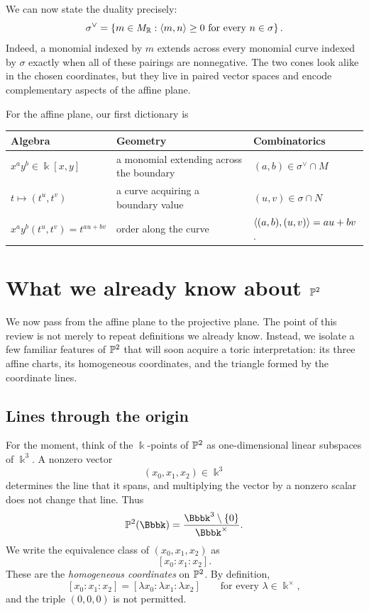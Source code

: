 We can now state the duality precisely:
\[
\sigma^\vee
=
\left\{
m\in M_{\mathbb{R}}:
\left\langle m,n\right\rangle\geq0
\text{ for every }n\in\sigma
\right\}.
\]
Indeed, a monomial indexed by \(m\) extends across every monomial curve
indexed by \(\sigma\) exactly when all of these pairings are
nonnegative. The two cones look alike in the chosen coordinates, but
they live in paired vector spaces and encode complementary aspects of
the affine plane.

\begin{threedictionaries}
For the affine plane, our first dictionary is
\begin{center}
\small
\begin{tabularx}{\linewidth}{
  >{\centering\arraybackslash}X|
  >{\centering\arraybackslash}X|
  >{\centering\arraybackslash}X}
\textbf{Algebra} & \textbf{Geometry} & \textbf{Combinatorics}\\
\hline
\(x^ay^b\in\Bbbk[x,y]\) &
a monomial extending across the boundary &
\((a,b)\in\sigma^\vee\cap M\)
\\[2mm]
\(t\mapsto(t^u,t^v)\) &
a curve acquiring a boundary value &
\((u,v)\in\sigma\cap N\)
\\[2mm]
\(x^ay^b(t^u,t^v)=t^{au+bv}\) &
order along the curve &
\(\left\langle (a,b),(u,v)\right\rangle=au+bv\).
\end{tabularx}
\end{center}
\end{threedictionaries}


\section{What we already know about
\texorpdfstring{\(\mathbb{P}^2\)}{P2}}
\label{sec:p2-review}

We now pass from the affine plane to the projective plane. The point of
this review is not merely to repeat definitions we already know.
Instead, we isolate a few familiar features of \(\mathbb{P}^2\) that will
soon acquire a toric interpretation: its three affine charts, its
homogeneous coordinates, and the triangle formed by the coordinate
lines.

\subsection{Lines through the origin}

For the moment, think of the \(\Bbbk\)-points of \(\mathbb{P}^2\) as
one-dimensional linear subspaces of \(\Bbbk^3\). A nonzero vector
\[
(x_0,x_1,x_2)\in\Bbbk^3
\]
determines the line that it spans, and multiplying the vector by a
nonzero scalar does not change that line. Thus
\[
\PP^2(\Bbbk)
=
\frac{\Bbbk^3\setminus\{0\}}{\Bbbk^\times}.
\]
We write the equivalence class of \((x_0,x_1,x_2)\) as
\[
[x_0:x_1:x_2].
\]
These are the \emph{homogeneous coordinates} on \(\mathbb{P}^2\). By
definition,
\[
[x_0:x_1:x_2]
=
[\lambda x_0:\lambda x_1:\lambda x_2]
\qquad
\text{for every }\lambda\in\Bbbk^\times,
\]
and the triple \((0,0,0)\) is not permitted.

